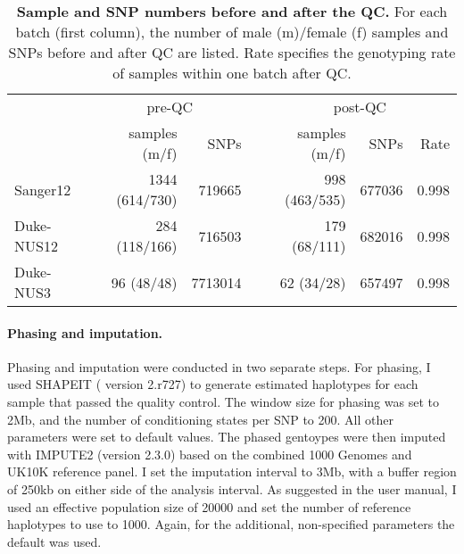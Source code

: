 \begin{table}[htbp]
  \centering
  \caption[\textbf{Sample and SNP numbers before and after the QC. }]{\textbf{Sample and SNP numbers before and after the QC. } For each batch (first column), the number of male (m)/female (f) samples and SNPs before and after QC are listed. Rate specifies the genotyping rate of samples within one batch after QC. }
    \begin{tabular}{lrrrrrr}
    \toprule
          & \multicolumn{2}{c}{pre-QC} &       & \multicolumn{3}{c}{post-QC} \\
\cmidrule{2-3}\cmidrule{5-7}          & samples (m/f) & SNPs  &       & samples (m/f) & SNPs  & Rate \\
\cmidrule{2-7}    Sanger12 & \num{1344}  (\num{614}/\num{730}) & \num{719665} &       & \num{998} (\num{463}/\num{535}) & \num{677036} & \num{0.998} \\
    Duke-NUS12 & \num{284} (\num{118}/\num{166}) & \num{716503} &       & \num{179} (\num{68}/\num{111}) & \num{682016} & \num{0.998} \\
    Duke-NUS3 & \num{96} (\num{48}/\num{48}) & \num{7713014} &       & \num{62} (\num{34}/\num{28}) & \num{657497} & \num{0.998} \\
    \bottomrule
    \end{tabular}%
    \label{tab:genoOverview}%
\end{table}%

\paragraph{Phasing and imputation.} Phasing and imputation were conducted in two separate steps. For phasing, I used SHAPEIT ( version 2.r727) \citep{Delaneau2012,Delaneau2013} to generate estimated haplotypes for each sample that passed the quality control. The window size for phasing was set to 2Mb, and the number of conditioning states per SNP to \num{200}. All other parameters were set to default values. The phased gentoypes were then imputed with IMPUTE2  (version 2.3.0) \citep{Marchini2007, Howie2009} based on the combined \num{1000} Genomes \citep{1000Genomes2015} and UK10K \citep{UK10KConsortium2015} reference panel. I set the imputation interval to 3Mb,  with a buffer region of \num{250}kb on either side of the analysis interval. As suggested in the user manual, I used an effective population size of \num{20000} and set the number of reference haplotypes to use to \num{1000}. Again, for the additional, non-specified parameters the default was used.

